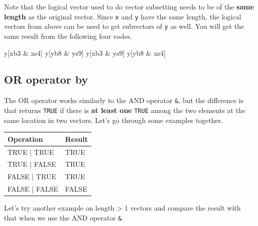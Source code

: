 \documentclass[
]{book}
\newenvironment{Shaded}{\begin{snugshade}}{\end{snugshade}}
\newcommand{\NormalTok}[1]{#1}
\newcommand{\SpecialCharTok}[1]{\textcolor[rgb]{0.00,0.00,0.00}{#1}}
\begin{document}
Note that the logical vector used to do vector subsetting needs to be of the \textbf{same length} as the original vector. Since \texttt{x} and \texttt{y} have the same length, the logical vectors from above can be used to get subvectors of \texttt{y} as well. You will get the same result from the following four codes.

\begin{Shaded}
\begin{Highlighting}[]
\NormalTok{y[xb3 }\SpecialCharTok{\&}\NormalTok{ xs4]}
\NormalTok{y[yb8 }\SpecialCharTok{\&}\NormalTok{ ys9]}
\NormalTok{y[xb3 }\SpecialCharTok{\&}\NormalTok{ ys9]}
\NormalTok{y[yb8 }\SpecialCharTok{\&}\NormalTok{ xs4]}
\end{Highlighting}
\end{Shaded}

\hypertarget{or-operator-by}{%
\subsection{\texorpdfstring{OR operator by \texttt{\textbar{}}}{OR operator by \textbar{}}}\label{or-operator-by}}

The OR operator \texttt{\textbar{}} works similarly to the AND operator \texttt{\&}, but the difference is that \texttt{\textbar{}} returns \texttt{TRUE} if there is \textbf{at least one} \texttt{TRUE} among the two elements at the same location in two vectors. Let's go through some examples together.

\begin{tabular}{l|l}
\hline
Operation & Result\\
\hline
TRUE | TRUE & TRUE\\
\hline
TRUE | FALSE & TRUE\\
\hline
FALSE | TRUE & TRUE\\
\hline
FALSE | FALSE & FALSE\\
\hline
\end{tabular}

Let's try another example on length \textgreater{} 1 vectors and compare the result with that when we use the AND operator \texttt{\&}.
\end{document}
